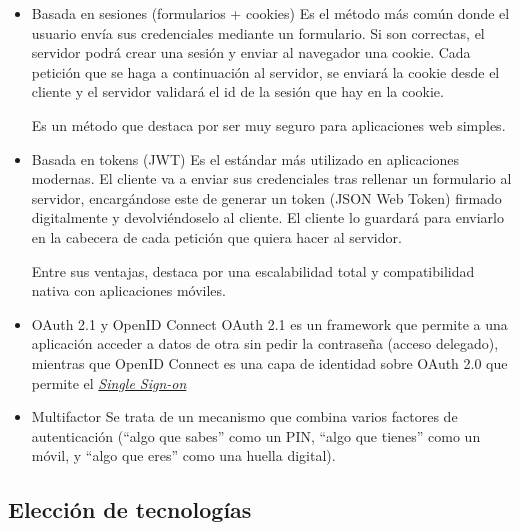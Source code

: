 \begin{itemize}
    \item Basada en sesiones (formularios + cookies)
    \newline
    Es el método más común donde el usuario envía sus credenciales mediante un formulario. Si son correctas, el servidor
    podrá crear una sesión y enviar al navegador una cookie. Cada petición que se haga a continuación al servidor, se 
    enviará la cookie desde el cliente y el servidor validará el id de la sesión que hay en la cookie. 

    Es un método que destaca por ser muy seguro para aplicaciones web simples.

    \item Basada en tokens (JWT)
    \newline
    Es el estándar más utilizado en aplicaciones modernas. El cliente va a enviar sus credenciales tras rellenar un 
    formulario al servidor, encargándose este de generar un token (JSON Web Token) firmado digitalmente y devolviéndoselo 
    al cliente. El cliente lo guardará para enviarlo en la cabecera de cada petición que quiera hacer al servidor.

    Entre sus ventajas, destaca por una escalabilidad total y compatibilidad nativa con aplicaciones móviles.

    \item OAuth 2.1 y OpenID Connect
    \newline
    OAuth 2.1 es un framework que permite a una aplicación acceder a datos de otra sin pedir la contraseña (acceso delegado), 
    mientras que OpenID Connect es una capa de identidad sobre OAuth 2.0 que permite el \hyperlink{singleSignOn}{\textit{Single Sign-on}}

    \item Multifactor
    \newline
    Se trata de un mecanismo que combina varios factores de autenticación (``algo que sabes'' como un PIN, ``algo que 
    tienes'' como un móvil, y ``algo que eres'' como una huella digital).

\end{itemize}


\subsection{Elección de tecnologías}